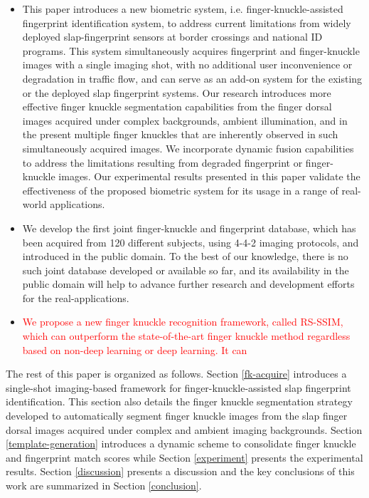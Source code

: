 \begin{itemize}
    \item This paper introduces a new biometric system, i.e. finger-knuckle-assisted fingerprint identification system, to address current limitations from widely deployed slap-fingerprint sensors at border crossings and national ID programs. This system simultaneously acquires fingerprint and finger-knuckle images with a single imaging shot, with no additional user inconvenience or degradation in traffic flow, and can serve as an add-on system for the existing or the deployed slap fingerprint systems. Our research introduces more effective finger knuckle segmentation capabilities from the finger dorsal images acquired under complex backgrounds, ambient illumination, and in the present multiple finger knuckles that are inherently observed in such simultaneously acquired images. We incorporate dynamic fusion capabilities to address the limitations resulting from degraded fingerprint or finger-knuckle images. Our experimental results presented in this paper validate the effectiveness of the proposed biometric system for its usage in a range of real-world applications. 
    \item We develop the first joint finger-knuckle and fingerprint database, which has been acquired from 120 different subjects, using 4-4-2 imaging protocols, and introduced in the public domain. To the best of our knowledge, there is no such joint database developed or available so far, and its availability in the public domain will help to advance further research and development efforts for the real-applications. 
    \item \textcolor{red}{We propose a new finger knuckle recognition framework, called RS-SSIM, which can outperform the state-of-the-art finger knuckle method regardless based on non-deep learning or deep learning. It can } 
\end{itemize}


The rest of this paper is organized as follows. Section \ref{fk-acquire} introduces a single-shot imaging-based framework for finger-knuckle-assisted slap fingerprint identification. This section also details the finger knuckle segmentation strategy developed to automatically segment finger knuckle images from the slap finger dorsal images acquired under complex and ambient imaging backgrounds. Section \ref{template-generation} introduces a dynamic scheme to consolidate finger knuckle and fingerprint match scores while Section \ref{experiment} presents the experimental results. Section \ref{discussion} presents a discussion and the key conclusions of this work are summarized in Section \ref{conclusion}.
